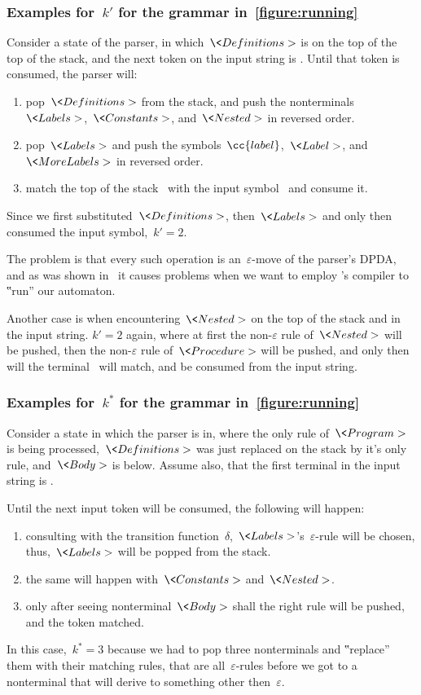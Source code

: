 \subsubsection{Examples for~$k'$ for the grammar in~\cref{figure:running}}
Consider a state of the parser, in which~$\<Definitions>$ is on
  the top of the top of the stack, and the next token on the input string
  is .
Until that token is consumed, the parser will:
  \begin{enumerate}
    \item pop~$\<Definitions>$ from the stack, and push the
      nonterminals~$\<Labels>$,~$\<Constants>$, and~$\<Nested>$
      in reversed order.
    \item pop~$\<Labels>$ and push the symbols~$\cc{label}$,~$\<Label>$,
      and~$\<MoreLabels>$ in reversed order.
    \item match the top of the stack~ with the input
      symbol~ and consume it.
  \end{enumerate}
Since we first substituted~$\<Definitions>$, then~$\<Labels>$
  and only then consumed the input symbol,~$k'=2$.

The problem is that every such operation is an~$ε$-move of the
  parser's DPDA, and as was shown in~ it causes
  problems when we want to employ \Java's compiler to ‟run” our automaton.

Another case is when encountering~$\<Nested>$ on the top of the stack
  and  in the input string.
$k'=2$ again, where at first the non-$ε$ rule of~$\<Nested>$ will
  be pushed, then the non-$ε$ rule of~$\<Procedure>$ will be
  pushed, and only then will the terminal~ will match,
  and be consumed from the input string.

\subsubsection{Examples for~$k^*$ for the grammar in~\cref{figure:running}}
Consider a state in which the parser is in, where the
  only rule of~$\<Program>$ is being processed,~$\<Definitions>$
  was just replaced on the stack by it's only rule, and~$\<Body>$ is below.
Assume also, that the first terminal in the input string is .

Until the next input token will be consumed, the following will happen:
  \begin{enumerate}
    \item consulting with the transition
      function~$δ$,~$\<Labels>$'s~$ε$-rule will
      be chosen,
      thus,~$\<Labels>$ will be popped from the stack.
    \item the same will happen with~$\<Constants>$
      and~$\<Nested>$.
    \item only after seeing nonterminal~$\<Body>$ shall the right rule will be
      pushed, and the token matched.
  \end{enumerate}
In this case,~$k^*=3$ because we had to pop three nonterminals and
  ‟replace” them with their matching rules, that are all~$ε$-rules
  before we got to a nonterminal that will derive to something other
  then~$ε$.

